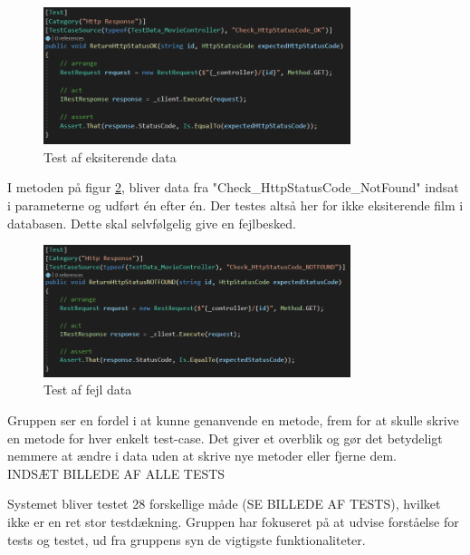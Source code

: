\begin{figure}[H]
    \centering
    \includegraphics[width=0.8\textwidth]{figures/testmoviestatusok.PNG}
    \caption{Test af eksiterende data}
    \label{fig:testeks}
\end{figure}

I metoden på figur \ref{fig:testeks2}, bliver data fra "Check\_HttpStatusCode\_NotFound" indsat i parameterne
og udført én efter én. Der testes altså her for ikke eksiterende film i databasen. Dette skal selvfølgelig
give en fejlbesked.  

\begin{figure}[H]
    \centering
    \includegraphics[width=0.8\textwidth]{figures/testmoviestatusnotfound.PNG}
    \caption{Test af fejl data}
    \label{fig:testeks2}
\end{figure}

Gruppen ser en fordel i at kunne genanvende en metode, 
frem for at skulle skrive en metode for hver enkelt test-case. 
Det giver et overblik og gør det betydeligt nemmere at ændre i data uden at skrive nye metoder eller fjerne dem.\\

INDSÆT BILLEDE AF ALLE TESTS

Systemet bliver testet 28 forskellige måde (SE BILLEDE AF TESTS), hvilket ikke er en ret stor testdækning. 
Gruppen har fokuseret på at udvise forståelse for tests og testet, ud fra gruppens syn de vigtigste funktionaliteter.    